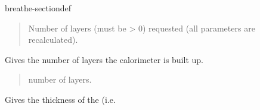 \documentclass[letterpaper,10pt,english]{sphinxmanual}
\begin{document}
\begin{fulllineitems}
\begin{sphinxuseclass}{breathe-sectiondef}
\begin{fulllineitems}
\sphinxAtStartPar
\begin{quote}\begin{description}
\sphinxAtStartPar
\sphinxstylestrong{{[}in{]}} Number of layers (must be \textgreater{} 0) requested (all parameters are recalculated). 

\end{description}\end{quote}


\end{fulllineitems}


\begin{fulllineitems}
\label{\detokenize{Simulation/SimulationCodeDoc:_CPPv4NK8Geometry12GetNumLayersEv}}
\pysigstartsignatures
\pysigstartmultiline
{}
\pysigstopmultiline
\pysigstopsignatures
\sphinxAtStartPar
Gives the number of layers the calorimeter is built up. 

\sphinxAtStartPar
\begin{quote}\begin{description}
\sphinxAtStartPar
number of layers. 

\end{description}\end{quote}


\end{fulllineitems}


\begin{fulllineitems}
\label{\detokenize{Simulation/SimulationCodeDoc:_CPPv4NK8Geometry12GetCaloThickEv}}
\pysigstartsignatures
\pysigstartmultiline
{}
\pysigstopmultiline
\pysigstopsignatures
\sphinxAtStartPar
Gives the thickness of the  (i.e. 


\end{fulllineitems}
\end{sphinxuseclass}
\end{fulllineitems}
\end{document}
